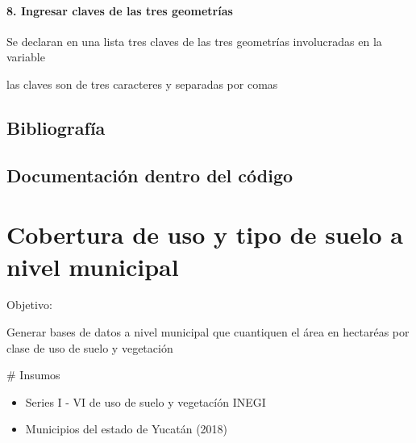 \documentclass[letterpaper,10pt,spanish]{sphinxmanual}
\begin{document}
\paragraph{8. Ingresar claves de las tres geometrías}
\label{\detokenize{nivel_geometrias:ingresar-claves-de-las-tres-geometrias}}
Se declaran en una lista tres claves de las tres geometrías involucradas
en la variable 

las claves son de tres caracteres y separadas por comas

\begin{sphinxVerbatim}[commandchars=\\\{\}]
\PYG{p}{[}\PYG{p}{]}
\end{sphinxVerbatim}


\subsection{Bibliografía}
\label{\detokenize{nivel_geometrias:bibliografia}}

\subsection{Documentación dentro del código}
\label{\detokenize{nivel_geometrias:documentacion-dentro-del-codigo}}

\section{Cobertura de uso y tipo de suelo a nivel municipal}
\label{\detokenize{usvmunicipal:cobertura-de-uso-y-tipo-de-suelo-a-nivel-municipal}}\label{\detokenize{usvmunicipal::doc}}
Objetivo:

Generar bases de datos  a nivel municipal que cuantiquen el área en hectaréas por clase
de uso de suelo y vegetación

\# Insumos
\begin{itemize}
\item {} 
Series I - VI de uso de suelo y vegetacíón INEGI

\item {} 
Municipios del estado de Yucatán (2018)

\end{itemize}
\end{document}
